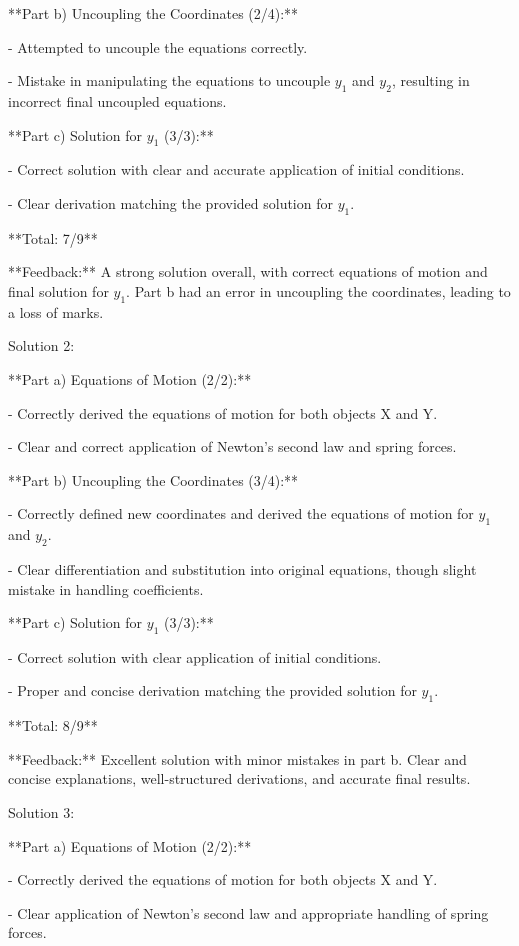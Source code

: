 \documentclass[a4paper,11pt]{article}
\begin{document}
**Part b) Uncoupling the Coordinates (2/4):**

- Attempted to uncouple the equations correctly.

- Mistake in manipulating the equations to uncouple \( y_1 \) and \( y_2 \), resulting in incorrect final uncoupled equations.

**Part c) Solution for \( y_1 \) (3/3):**

- Correct solution with clear and accurate application of initial conditions.

- Clear derivation matching the provided solution for \( y_1 \).

**Total: 7/9**

**Feedback:** A strong solution overall, with correct equations of motion and final solution for \( y_1 \). Part b had an error in uncoupling the coordinates, leading to a loss of marks.

Solution 2:

**Part a) Equations of Motion (2/2):**

- Correctly derived the equations of motion for both objects X and Y.

- Clear and correct application of Newton's second law and spring forces.

**Part b) Uncoupling the Coordinates (3/4):**

- Correctly defined new coordinates and derived the equations of motion for \( y_1 \) and \( y_2 \).

- Clear differentiation and substitution into original equations, though slight mistake in handling coefficients.

**Part c) Solution for \( y_1 \) (3/3):**

- Correct solution with clear application of initial conditions.

- Proper and concise derivation matching the provided solution for \( y_1 \).

**Total: 8/9**

**Feedback:** Excellent solution with minor mistakes in part b. Clear and concise explanations, well-structured derivations, and accurate final results.

Solution 3:

**Part a) Equations of Motion (2/2):**

- Correctly derived the equations of motion for both objects X and Y.

- Clear application of Newton's second law and appropriate handling of spring forces.
\end{document}
